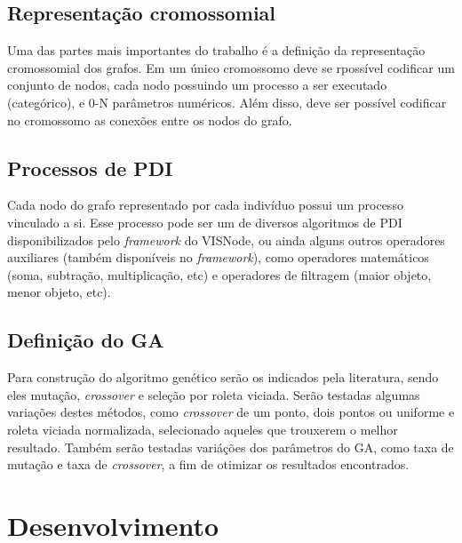 \documentclass[12pt,oneside,a4paper,english,french,spanish,brazil,]{abntex2}
\begin{document}
\section{Representação cromossomial}

Uma das partes mais importantes do trabalho é a definição da representação cromossomial dos grafos. Em um único cromossomo deve se rpossível codificar um conjunto de nodos, cada nodo possuindo um processo a ser executado (categórico), e 0-N parâmetros numéricos. Além disso, deve ser possível codificar no cromossomo as conexões entre os nodos do grafo.


\section{Processos de PDI}

Cada nodo do grafo representado por cada indivíduo possui um processo vinculado a si. Esse processo pode ser um de diversos algoritmos de PDI disponibilizados pelo \textit{framework} do VISNode, ou ainda alguns outros operadores auxiliares (também disponíveis no \textit{framework}), como operadores matemáticos (soma, subtração, multiplicação, etc) e operadores de filtragem (maior objeto, menor objeto, etc).

\section{Definição do GA}

Para construção do algoritmo genético serão os indicados pela literatura, sendo eles mutação, \textit{crossover} e seleção por roleta viciada. Serão testadas algumas variações destes métodos, como \textit{crossover} de um ponto, dois pontos ou uniforme e roleta viciada normalizada, selecionado aqueles que trouxerem o melhor resultado. Também serão testadas variáções dos parâmetros do GA, como taxa de mutação e taxa de \textit{crossover}, a fim de otimizar os resultados encontrados.

\chapter{Desenvolvimento}
\end{document}
